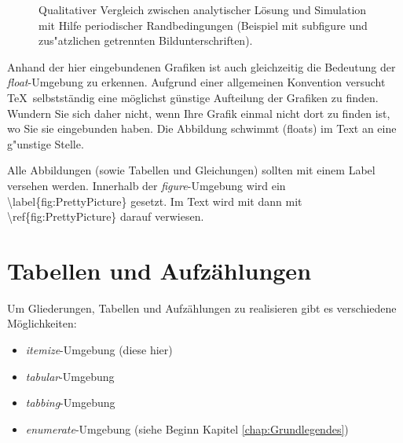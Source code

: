 \begin{figure}[htbp]

  \begin{center}
    \hspace{0.5cm}
    \caption[Vergleich analytische L"osung und Simulation.]{Qualitativer Vergleich zwischen
analytischer Lösung und Simulation mit Hilfe periodischer
Randbedingungen (Beispiel mit {\sf subfigure} und zus"atzlichen getrennten Bildunterschriften).}
    \label{fig:subfigure}
  \end{center}
\end{figure}


Anhand der hier eingebundenen Grafiken ist auch gleichzeitig die Bedeutung
der {\it float}-Umgebung zu erkennen.  Aufgrund einer allgemeinen Konvention
versucht \TeX\, selbstständig eine möglichst günstige Aufteilung der Grafiken
zu finden.  Wundern Sie sich daher nicht, wenn Ihre Grafik einmal nicht dort
zu finden ist, wo Sie sie eingebunden haben. Die Abbildung schwimmt
(floats) im Text an eine g"unstige Stelle.


Alle Abbildungen (sowie Tabellen und Gleichungen) sollten mit einem
Label versehen werden. Innerhalb der {\it figure}-Umgebung wird ein
{\sf \textbackslash label\{fig:PrettyPicture\}} gesetzt.  Im Text wird mit dann mit
{\sf \textbackslash ref\{fig:PrettyPicture\}} darauf verwiesen. 



\section{Tabellen und Aufzählungen}
\label{sec:Tabellen}

Um Gliederungen, Tabellen und Aufzählungen zu realisieren gibt es
verschiedene Möglichkeiten:
\begin{itemize}
\item {\it itemize}-Umgebung (diese hier)
\item {\it tabular}-Umgebung
\item {\it tabbing}-Umgebung
\item {\it enumerate}-Umgebung (siehe Beginn Kapitel \ref{chap:Grundlegendes}) 
\end{itemize}


